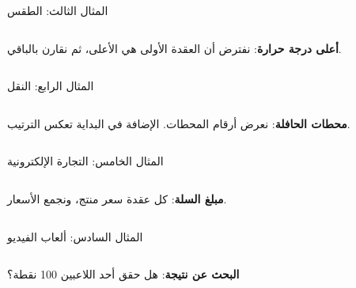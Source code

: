 \documentclass[aspectratio=169, 11pt, t, xcolor={table}]{beamer}
\begin{document}
\begin{frame}[t]{المثال الثالث: الطقس}
    \begin{columns}[T]
        {\small \textbf{أعلى درجة حرارة}: نفترض أن العقدة الأولى هي الأعلى، ثم نقارن بالباقي.\par}
        \vspace{0.3cm}
    \end{columns}
\end{frame}

\begin{frame}[t]{المثال الرابع: النقل}
    \begin{columns}[T]
        {\small \textbf{محطات الحافلة}: نعرض أرقام المحطات. الإضافة في البداية تعكس الترتيب.\par}
        \vspace{0.3cm}
    \end{columns}
\end{frame}

\begin{frame}[t]{المثال الخامس: التجارة الإلكترونية}
    \begin{columns}[T]
        {\small \textbf{مبلغ السلة}: كل عقدة سعر منتج، ونجمع الأسعار.\par}
        \vspace{0.3cm}
    \end{columns}
\end{frame}

\begin{frame}[t]{المثال السادس: ألعاب الفيديو}
    \begin{columns}[T]
        {\small \textbf{البحث عن نتيجة}: هل حقق أحد اللاعبين 100 نقطة؟\par}
        \vspace{0.3cm}
    \end{columns}
\end{frame}
\end{document}
